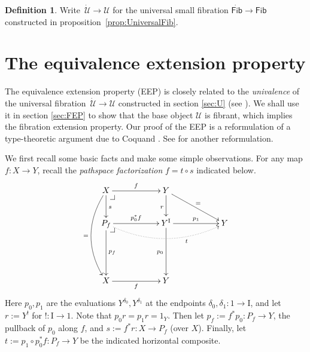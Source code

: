 \documentclass[12pt]{article}
\makeatletter
\newcommand{\pbcorner}[1][dr]{\save*!/#1-1.2pc/#1:(-1,1)@^{|-}\restore}
\newcommand{\ra}{\ensuremath{\rightarrow}}
\newcommand{\I}{\ensuremath{\mathrm{I}}}
\newcommand{\U}{\ensuremath{\mathcal{U}}}
\newcommand{\UU}{\ensuremath{\,\dot{\mathcal{U}}}}
\newcommand{\Fib}{\ensuremath{\mathsf{Fib}}}
\newcommand{\FFib}{\ensuremath{\dot{\mathsf{Fib}}}}
\theoremstyle{remark}
\theoremstyle{definition}
\newtheorem{definition}[theorem]{Definition}
\makeatother
\begin{document}
\begin{definition}\label{def:U}
Write $\UU \ra \U$ for the universal small fibration $\FFib\ra\Fib$ constructed in proposition~\ref{prop:UniversalFib}.
\end{definition}

\section{The equivalence extension property}\label{sec:EEP}

The equivalence extension property (EEP) is closely related to the \emph{univalence} of the universal fibration $\UU\ra\U$ constructed in section \ref{sec:U} (see \cite{Shu2015}).  We shall use it in section \ref{sec:FEP} to show that the base object $\U$ is fibrant, which implies the fibration extension property.  Our proof of the EEP is a reformulation of a type-theoretic argument due to Coquand \cite{CCHM}.  See \cite{sattler} for another reformulation.

We first recall some basic facts and make some simple observations. For any map $f :X\ra Y$, recall the \emph{pathspace factorization} $f = t\circ s$ indicated below.
\begin{equation}\label{diag:pathspace factorization}
\xymatrix{
X \ar@/_1.5pc/[ddd]_= \ar[d]^s \ar[rr]^f \pbcorner && Y \ar[d]_r \ar[rrd]^=\\
P_f  \ar[dd]^{p_f} \ar[rr]^{p_0^*f} \ar@{.>}@/_1.5pc/[rrrr]_<<<<<<<<<<<<<<<t \pbcorner && Y^\I \ar[dd]_{p_0} \ar[rr]^-{p_1} && Y \\
\\
X \ar[rr]_f  &&  Y &
}
\end{equation}
Here $p_0, p_1$ are the evaluations $Y^{\delta_{0}}, Y^{\delta_{1}}$ at the endpoints $\delta_0, \delta_1 : 1\ra\I$, and let $r:= Y^!$ for $! : \I\ra 1$. Note that $p_0r = p_1r = 1_Y$.  Then let  $p_f := f^*p_0 : P_f \ra Y$, the pullback of $p_0$ along $f$, and $s:= f^*r : X\ra P_f$ (over $X$).  Finally, let $t:= p_1\circ p_0^*f : P_f \ra Y$ be the indicated horizontal composite. 
\end{document}

